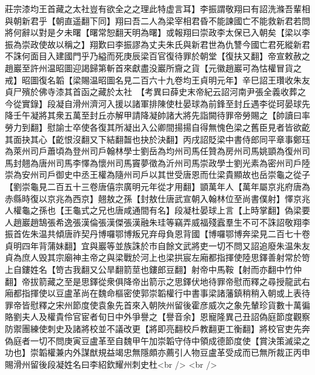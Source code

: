 莊宗漆均王首藏之太社豈有欲全之之理此特虚言耳】李振謂敬翔曰有詔洗滌吾輩相與朝新君乎【朝直遥翻下同】翔曰吾二人為梁宰相君昏不能諫國亡不能救新君若問將何辭以對是夕未曙【曙常恕翻天明為曙】或報翔曰崇政李太保已入朝矣【梁以李振為崇政使故以稱之】翔歎曰李振謬為丈夫朱氏與新君世為仇讐今國亡君死縱新君不誅何面目入建國門乎乃縊而死庚辰梁百官復待罪於朝堂【復扶又翻】帝宣敕赦之趙巖至許州温昭圖迎謁歸第斬首來獻盡没巖所齎之貨【元徽趙巖可為怙權冒貨之戒】昭圖復名韜【梁賜温昭圖名見二百六十九卷均王貞明元年】辛巳詔王瓚收朱友貞尸殯於佛寺漆其首函之藏於太社　【考異曰薛史末帝紀云詔河南尹張全義收葬之今從實錄】段凝自滑州濟河入援以諸軍排陳使杜晏球為前鋒至封丘遇李從珂晏球先降壬午凝將其衆五萬至封丘亦解甲請降凝帥諸大將先詣闕待罪帝勞賜之【帥讀曰率勞力到翻】慰諭士卒使各復其所凝出入公卿間揚揚自得無愧色梁之舊臣見者皆欲齕其面抉其心【齕恨沒翻又下結翻齧也抉於決翻】丙戌詔貶梁中書侍郎同平章事鄭珏為萊州司戶蕭頃為登州司戶翰林學士劉岳為均州司馬任贊為房州司馬姚顗為復州司馬封翹為唐州司馬李懌為懷州司馬竇夢徵為沂州司馬崇政學士劉光素為密州司戶陸崇為安州司戶御史中丞王權為隨州司戶以其世受唐恩而仕梁貴顯故也岳崇龜之從子【劉崇龜見二百五十三卷唐僖宗廣明元年從才用翻】顗萬年人【萬年屬京兆府唐為赤縣時復以京兆為西京】翹敖之孫【封敖仕唐武宣朝入翰林位至尚書僕射】懌京兆人權龜之孫也【王龜式之兄也唐咸通間有名】段凝杜晏球上言【上時掌翻】偽梁要人趙巖趙鵠張希逸張漢倫張漢傑張漢融朱珪等竊弄威福殘蠧羣生不可不誅詔敬翔李振首佐朱温共傾唐祚契丹博囉鄂博叛兄弃母負恩背國【博囉鄂博奔梁見二百七十卷貞明四年背蒲妹翻】宜與巖等並族誅於市自餘文武將吏一切不問又詔追廢朱温朱友貞為庶人毁其宗廟神主帝之與梁戰於河上也梁拱宸左廂都指揮使陸思鐸善射常於笴上自鏤姓名【笴古我翻又公旱翻箭莖也鏤郎豆翻】射帝中馬鞍【射而亦翻中竹仲翻】帝拔箭藏之至是思鐸從衆俱降帝出箭示之思鐸伏地待罪帝慰而釋之尋授龍武右廂都指揮使以豆盧革尚在魏命樞密使郭崇韜權行中書事梁諸藩鎮稍稍入朝或上表待罪帝皆慰釋之宋州節度使袁象先首來入朝陜州留後霍彦威次之象先輦珍貨數十萬徧賂劉夫人及權貴伶官宦者旬日中外爭譽之【譽音余】恩寵隆異己丑詔偽庭節度觀察防禦團練使刺史及諸將校並不議改更【將即亮翻校戶教翻更工衡翻】將校官吏先奔偽庭者一切不問庚寅豆盧革至自魏甲午加崇韜守侍中領成德節度使【賞決策滅梁之功也】崇韜權兼内外謀猷規益竭忠無隱頗亦薦引人物豆盧革受成而已無所裁正丙申賜滑州留後段凝姓名曰李紹欽耀州刺史杜<br />
<br />
